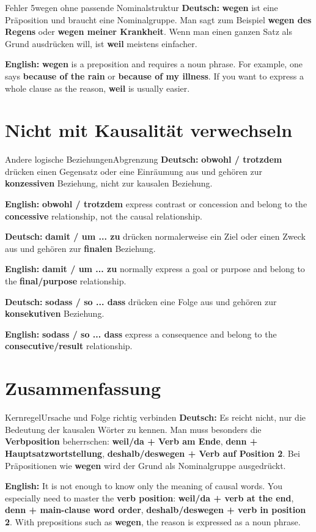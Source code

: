 \documentclass[a4paper,11pt]{article}
\newcommand{\GermanText}[1]{\textbf{Deutsch: }#1\par}
\newcommand{\EnglishText}[1]{{\small\color{SoftGray}\textbf{English: }#1\par}}
\begin{document}
        \begin{grammarentry}{Fehler 5}{wegen ohne passende Nominalstruktur}
            \GermanText{\textbf{wegen} ist eine Präposition und braucht eine Nominalgruppe. Man sagt zum Beispiel \textbf{wegen des Regens} oder \textbf{wegen meiner Krankheit}. Wenn man einen ganzen Satz als Grund ausdrücken will, ist \textbf{weil} meistens einfacher.}
            \EnglishText{\textbf{wegen} is a preposition and requires a noun phrase. For example, one says \textbf{because of the rain} or \textbf{because of my illness}. If you want to express a whole clause as the reason, \textbf{weil} is usually easier.}
        \end{grammarentry}

    \section{Nicht mit Kausalität verwechseln}

        \begin{grammarentry}{Andere logische Beziehungen}{Abgrenzung}
            \GermanText{\textbf{obwohl / trotzdem} drücken einen Gegensatz oder eine Einräumung aus und gehören zur \textbf{konzessiven} Beziehung, nicht zur kausalen Beziehung.}
            \EnglishText{\textbf{obwohl / trotzdem} express contrast or concession and belong to the \textbf{concessive} relationship, not the causal relationship.}

            \GermanText{\textbf{damit / um ... zu} drücken normalerweise ein Ziel oder einen Zweck aus und gehören zur \textbf{finalen} Beziehung.}
            \EnglishText{\textbf{damit / um ... zu} normally express a goal or purpose and belong to the \textbf{final/purpose} relationship.}

            \GermanText{\textbf{sodass / so ... dass} drücken eine Folge aus und gehören zur \textbf{konsekutiven} Beziehung.}
            \EnglishText{\textbf{sodass / so ... dass} express a consequence and belong to the \textbf{consecutive/result} relationship.}
        \end{grammarentry}

    \section{Zusammenfassung}

        \begin{grammarentry}{Kernregel}{Ursache und Folge richtig verbinden}
            \GermanText{Es reicht nicht, nur die Bedeutung der kausalen Wörter zu kennen. Man muss besonders die \textbf{Verbposition} beherrschen: \textbf{weil/da + Verb am Ende}, \textbf{denn + Hauptsatzwortstellung}, \textbf{deshalb/deswegen + Verb auf Position 2}. Bei Präpositionen wie \textbf{wegen} wird der Grund als Nominalgruppe ausgedrückt.}
            \EnglishText{It is not enough to know only the meaning of causal words. You especially need to master the \textbf{verb position}: \textbf{weil/da + verb at the end}, \textbf{denn + main-clause word order}, \textbf{deshalb/deswegen + verb in position 2}. With prepositions such as \textbf{wegen}, the reason is expressed as a noun phrase.}
        \end{grammarentry}
\end{document}
